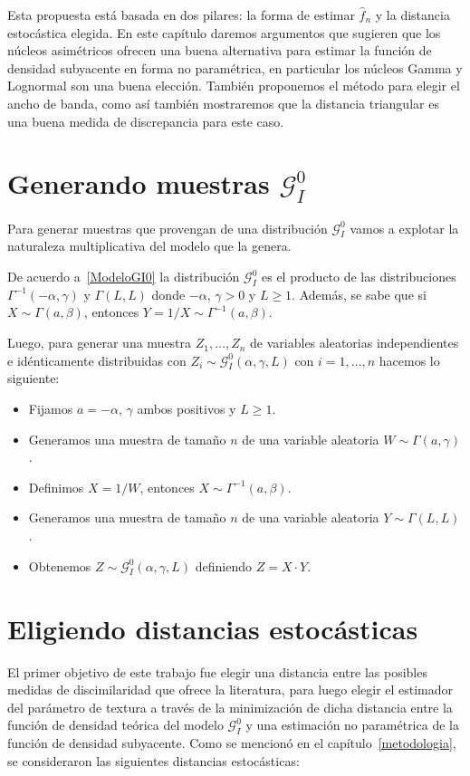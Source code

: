 Esta propuesta está basada en dos pilares: la forma de estimar $\widehat{f}_n$ y la distancia estocástica elegida. En este capítulo daremos argumentos que sugieren que los núcleos asimétricos ofrecen una buena alternativa para estimar la función de densidad subyacente en forma no paramétrica, en particular los núcleos Gamma y Lognormal son una buena elección. También proponemos el método para elegir el ancho de banda, como así también mostraremos que la distancia triangular es una buena medida de discrepancia para este caso.

\section{Generando muestras $\mathcal{G}_I^0$}

Para generar muestras que provengan de una distribución $\mathcal{G}_I^0$ vamos a explotar la naturaleza multiplicativa del modelo que la genera.

De acuerdo a~\ref{ModeloGI0} la distribución  $\mathcal{G}_I^0$ es el producto de las distribuciones $\Gamma^{-1}(-\alpha,\gamma)$ y $\Gamma(L,L)$ donde $-\alpha, \, \gamma >0$ y $L\geq 1$. Además, se sabe que si $X \sim \Gamma(a,\beta)$, entonces $Y = 1/X \sim \Gamma^{-1}(a,\beta)$.

Luego, para generar una muestra $Z_1, \ldots, Z_n$ de variables aleatorias independientes e idénticamente distribuidas con $Z_i \sim \mathcal{G}_I^0(\alpha,\gamma,L)$ con $i=1, \ldots, n$ hacemos lo siguiente:
\begin{itemize}
	\item Fijamos $a=-\alpha, \, \gamma$ ambos positivos y $L \geq 1$.
	\item Generamos una muestra de tamaño $n$ de una variable aleatoria $W \sim \Gamma(a,\gamma)$.
	\item Definimos $X=1/W$, entonces $X \sim \Gamma^{-1}(a,\beta)$.
	\item Generamos una muestra de tamaño $n$ de una variable aleatoria $Y \sim \Gamma(L,L)$.
	\item Obtenemos $Z \sim \mathcal{G}_I^0(\alpha,\gamma,L)$ definiendo $Z=X \cdot Y$.
\end{itemize}


\section{Eligiendo distancias estocásticas}
\label{EligiendoDistancias}

El primer objetivo de este trabajo fue elegir una distancia entre las posibles medidas de discimilaridad que ofrece la literatura, para luego elegir el estimador del parámetro de textura a través de la minimización de dicha distancia entre la función de densidad teórica del modelo $\mathcal{G}_I^0$ y una estimación no paramétrica de la función de densidad subyacente. Como se mencionó en el capítulo~\ref{metodologia}, se consideraron las siguientes distancias estocásticas:


